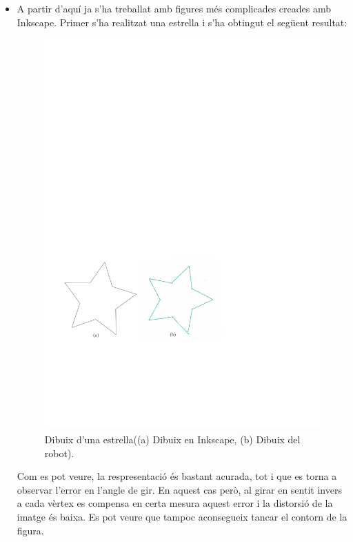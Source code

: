 \begin{itemize}
	\item A partir d'aquí ja s'ha treballat amb figures més complicades creades amb Inkscape. Primer s'ha realitzat una estrella i s'ha obtingut el següent resultat:
	\begin{figure}[H]
		\centering
		\includegraphics[scale=0.9]{resultatEstrella}
		\caption{Dibuix d'una estrella((a) Dibuix en Inkscape, (b) Dibuix del robot).}
		\label{fig:estrella}
	\end{figure}
	Com es pot veure, la respresentació és bastant acurada, tot i que es torna a observar l'error en l'angle de gir. En aquest cas però, al girar en sentit invers a cada vèrtex es compensa en certa mesura aquest error i la distorsió de la imatge és baixa. Es pot veure que tampoc aconsegueix tancar el contorn de la figura. 
	

\end{itemize}
